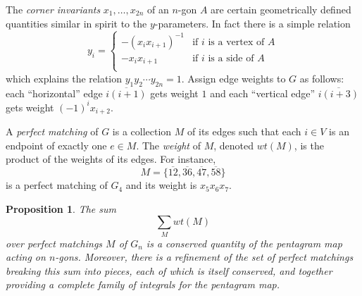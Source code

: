 \documentclass{amsart}
\newtheorem{proposition}[theorem]{Proposition}
\theoremstyle{definition}
\theoremstyle{remark}
\numberwithin{equation}{section}
\begin{document}
	The \emph{corner invariants} $x_1,\ldots, x_{2n}$ of an $n$-gon $A$ are certain geometrically defined quantities similar in spirit to the $y$-parameters.  In fact there is a simple relation
	\begin{displaymath}
		y_i = \begin{cases}
		-(x_ix_{i+1})^{-1} & \textrm{if $i$ is a vertex of $A$} \\
		-x_ix_{i+1} & \textrm{if $i$ is a side of $A$} \\
		\end{cases}
	\end{displaymath}
	which explains the relation $y_1y_2\cdots y_{2n}=1$.  Assign edge weights to $G$ as follows: each ``horizontal'' edge $\overline{i(i+1)}$ gets weight $1$ and each ``vertical edge'' $\overline{i(i+3)}$ gets weight $(-1)^ix_{i+2}$.  
	
	A \emph{perfect matching} of $G$ is a collection $M$ of its edges such that each $i \in V$ is an endpoint of exactly one $e \in M$.  The \emph{weight} of $M$, denoted $wt(M)$, is the product of the weights of its edges.  For instance, 
	\begin{displaymath}
		M = \{\overline{12}, \overline{36}, \overline{47}, \overline{58}\}
	\end{displaymath}
	is a perfect matching of $G_4$ and its weight is $x_5x_6x_7$.
	
	\begin{proposition}
		The sum
		\begin{displaymath}
			\sum_M wt(M)
		\end{displaymath}
		over perfect matchings $M$ of $G_n$ is a conserved quantity of the pentagram map acting on $n$-gons.  Moreover, there is a refinement of the set of perfect matchings breaking this sum into pieces, each of which is itself conserved, and together providing a complete family of integrals for the pentagram map.
	\end{proposition}
	
\end{document}
